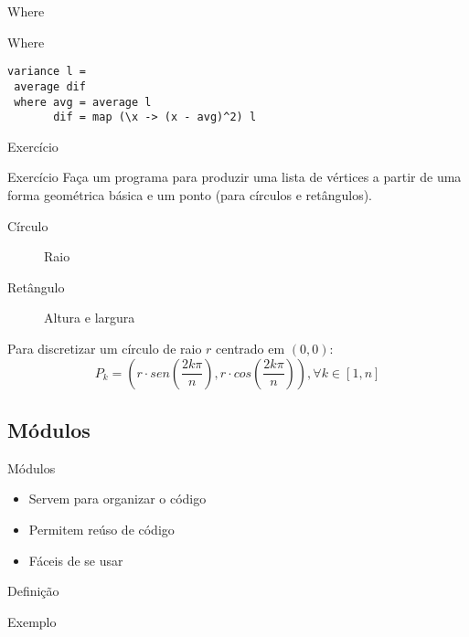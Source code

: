 \documentclass{beamer}
\begin{document}
		\begin{frame}[fragile]{Where}
		 \begin{block}{Where}
		  \begin{lstlisting}
variance l =
 average dif
 where avg = average l
       dif = map (\x -> (x - avg)^2) l
		  \end{lstlisting}
		 \end{block}		 
		\end{frame}
		
		\begin{frame}{Exercício}
		 \begin{block}{Exercício}
		  Faça um programa para produzir uma lista de vértices a partir de uma forma geométrica básica e um ponto (para círculos e retângulos).
		 \end{block}
		 \begin{description}
		  \item [Círculo] Raio
		  \item [Retângulo] Altura e largura
		 \end{description}
		 Para discretizar um círculo de raio $r$ centrado em $(0,0)$:
		 \[
		  P_k = ( r \cdot sen(\frac{2 k \pi}{n}) , r \cdot cos(\frac{2 k \pi}{n} ) ) , \forall k \in [1,n]
		 \]


		\end{frame}
		
		\subsection{Módulos}
			\begin{frame}[fragile]{Módulos}
			 \begin{itemize}
			  \item Servem para organizar o código
			  \item Permitem reúso de código
			  \item Fáceis de se usar
			 \end{itemize}
			\end{frame}
			
			\begin{frame}[fragile]{Definição}
			 \begin{block}{Exemplo}
			  
			 \end{block}
			\end{frame}
			
\end{document}
